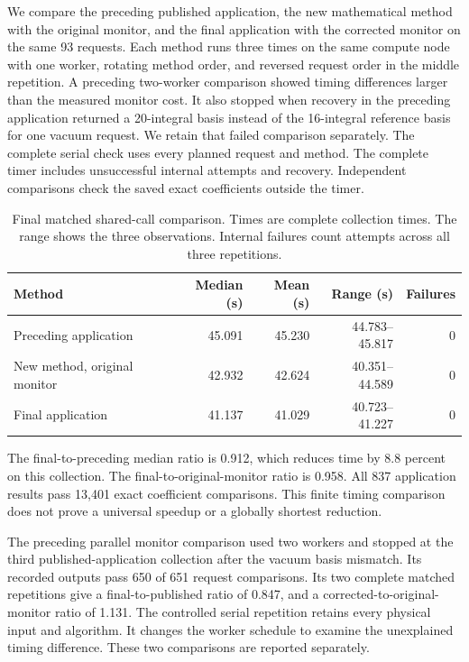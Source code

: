 We compare the preceding published application, the new mathematical method with the original monitor, and the final application with the corrected monitor on the same 93 requests. Each method runs three times on the same compute node with one worker, rotating method order, and reversed request order in the middle repetition. A preceding two-worker comparison showed timing differences larger than the measured monitor cost. It also stopped when recovery in the preceding application returned a 20-integral basis instead of the 16-integral reference basis for one vacuum request. We retain that failed comparison separately. The complete serial check uses every planned request and method. The complete timer includes unsuccessful internal attempts and recovery. Independent comparisons check the saved exact coefficients outside the timer.
\begin{table}[htbp]\centering\small
\caption{Final matched shared-call comparison. Times are complete collection times. The range shows the three observations. Internal failures count attempts across all three repetitions.}
\label{notes-triangle:tab:triangle-final}
\begin{tabular}{lrrrr}\toprule
Method & Median (s) & Mean (s) & Range (s) & Failures\\\midrule
Preceding application & 45.091 & 45.230 & 44.783--45.817 & 0 \\
New method, original monitor & 42.932 & 42.624 & 40.351--44.589 & 0 \\
Final application & 41.137 & 41.029 & 40.723--41.227 & 0 \\
\bottomrule\end{tabular}\end{table}
The final-to-preceding median ratio is 0.912, which reduces time by 8.8 percent on this collection. The final-to-original-monitor ratio is 0.958. All 837 application results pass 13,401 exact coefficient comparisons. This finite timing comparison does not prove a universal speedup or a globally shortest reduction.

The preceding parallel monitor comparison used two workers and stopped at the third published-application collection after the vacuum basis mismatch. Its recorded outputs pass 650 of 651 request comparisons. Its two complete matched repetitions give a final-to-published ratio of 0.847, and a corrected-to-original-monitor ratio of 1.131. The controlled serial repetition retains every physical input and algorithm. It changes the worker schedule to examine the unexplained timing difference. These two comparisons are reported separately.

